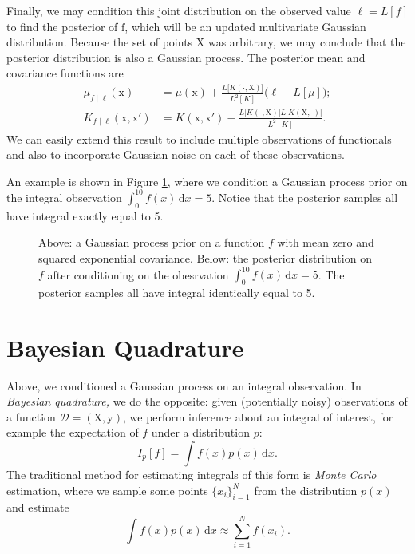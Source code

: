 \documentclass{article}
\newcommand{\given}{\mid}
\newcommand{\mc}[1]{\mathcal{#1}}
\newcommand{\data}{\mc{D}}
\newcommand{\intd}[1]{\,\mathrm{d}{#1}}
\newcommand{\mat}[1]{\bm{\mathrm{#1}}}
\renewcommand{\vec}[1]{\bm{\mathrm{#1}}}
\begin{document}
Finally, we may condition this joint distribution on the observed
value $\ell = L[f]$ to find the posterior of $\vec{f}$, which will be
an updated multivariate Gaussian distribution.  Because the set of
points $\mat{X}$ was arbitrary, we may conclude that the posterior
distribution is also a Gaussian process.  The posterior mean and
covariance functions are
\begin{align*}
  \mu_{f \given \ell}(\vec{x})
  &=
  \mu(\vec{x})
  +
  \frac{L\bigl[K(\cdot, \mat{X})\bigr]}{L^2[K]}
  \bigl(\ell - L[\mu]);
  \\
  K_{f \given \ell}(\vec{x}, \vec{x}')
  &=
  K(\vec{x}, \vec{x}')
  -
  \frac{L\bigl[K(\cdot, \mat{X})\bigr]L\bigl[K(\mat{X}, \cdot)\bigr]}{L^2[K]}.
\end{align*}
We can easily extend this result to include multiple observations of
functionals and also to incorporate Gaussian noise on each of these
observations.

An example is shown in Figure \ref{example}, where we condition a
Gaussian process prior on the integral observation $\int_{0}^{10} f(x)
\intd{x} = 5$.  Notice that the posterior samples all have integral
exactly equal to 5.

\begin{figure}
  \centering
  
  
  \caption{Above: a Gaussian process prior on a function $f$ with mean
    zero and squared exponential covariance.  Below: the posterior
    distribution on $f$ after conditioning on the obesrvation
    $\int_{0}^{10} f(x) \intd{x} = 5$.  The posterior samples all have
    integral identically equal to 5.}
  \label{example}
\end{figure}

\section*{Bayesian Quadrature}

Above, we conditioned a Gaussian process on an integral observation.
In \emph{Bayesian quadrature,} we do the opposite: given (potentially
noisy) observations of a function $\data = (\mat{X}, \vec{y})$, we
perform inference about an integral of interest, for example the
expectation of $f$ under a distribution $p$:
\begin{equation*}
  I_p[f] = \int f(x) p(x) \intd{x}.
\end{equation*}
The traditional method for estimating integrals of this form is
\emph{Monte Carlo} estimation, where we sample some points $\{ x_i
\}_{i = 1}^N$ from the distribution $p(x)$ and estimate
\begin{equation*}
  \int f(x) p(x) \intd{x}
  \approx
  \sum_{i = 1}^N f(x_i).
\end{equation*}
\end{document}
